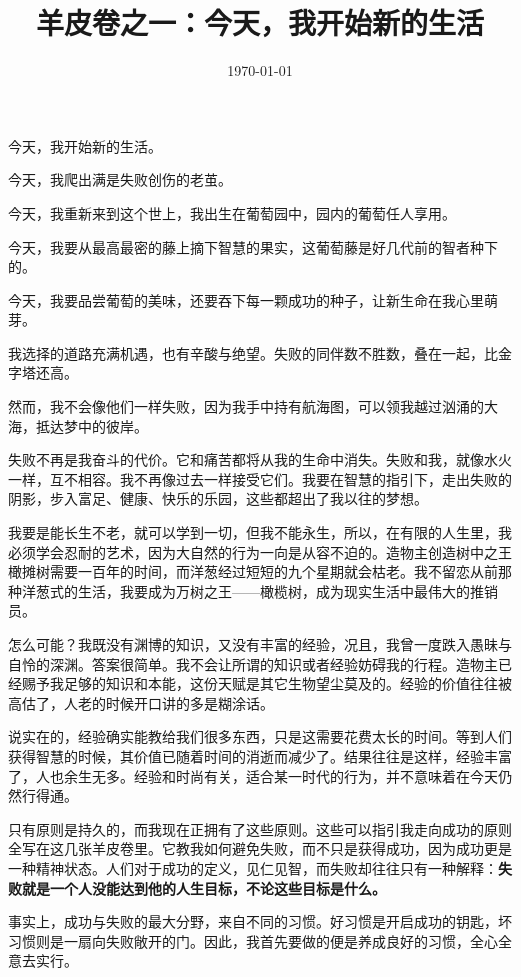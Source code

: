\documentclass[UTF8,a5paper]{ctexart}
\title{羊皮卷之一：今天，我开始新的生活}
\date{\today}
\begin{document}
\fangsong
\large
\maketitle

今天，我开始新的生活。

今天，我爬出满是失败创伤的老茧。

今天，我重新来到这个世上，我出生在葡萄园中，园内的葡萄任人享用。

今天，我要从最高最密的藤上摘下智慧的果实，这葡萄藤是好几代前的智者种下的。

今天，我要品尝葡萄的美味，还要吞下每一颗成功的种子，让新生命在我心里萌芽。

我选择的道路充满机遇，也有辛酸与绝望。失败的同伴数不胜数，叠在一起，比金字塔还高。

然而，我不会像他们一样失败，因为我手中持有航海图，可以领我越过汹涌的大海，抵达梦中的彼岸。

失败不再是我奋斗的代价。它和痛苦都将从我的生命中消失。失败和我，就像水火一样，互不相容。我不再像过去一样接受它们。我要在智慧的指引下，走出失败的阴影，步入富足、健康、快乐的乐园，这些都超出了我以往的梦想。

我要是能长生不老，就可以学到一切，但我不能永生，所以，在有限的人生里，我必须学会忍耐的艺术，因为大自然的行为一向是从容不迫的。造物主创造树中之王橄摊树需要一百年的时间，而洋葱经过短短的九个星期就会枯老。我不留恋从前那种洋葱式的生活，我要成为万树之王——橄榄树，成为现实生活中最伟大的推销员。

怎么可能？我既没有渊博的知识，又没有丰富的经验，况且，我曾一度跌入愚昧与自怜的深渊。答案很简单。我不会让所谓的知识或者经验妨碍我的行程。造物主已经赐予我足够的知识和本能，这份天赋是其它生物望尘莫及的。经验的价值往往被高估了，人老的时候开口讲的多是糊涂话。

说实在的，经验确实能教给我们很多东西，只是这需要花费太长的时间。等到人们获得智慧的时候，其价值已随着时间的消逝而减少了。结果往往是这样，经验丰富了，人也余生无多。经验和时尚有关，适合某一时代的行为，并不意味着在今天仍然行得通。

只有原则是持久的，而我现在正拥有了这些原则。这些可以指引我走向成功的原则全写在这几张羊皮卷里。它教我如何避免失败，而不只是获得成功，因为成功更是一种精神状态。人们对于成功的定义，见仁见智，而失败却往往只有一种解释：\textbf{失败就是一个人没能达到他的人生目标，不论这些目标是什么。}

事实上，成功与失败的最大分野，来自不同的习惯。好习惯是开启成功的钥匙，坏习惯则是一扇向失败敞开的门。因此，我首先要做的便是养成良好的习惯，全心全意去实行。
\end{document}
